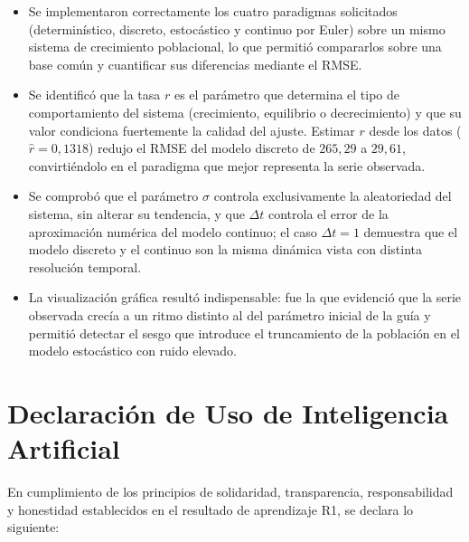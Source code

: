 \documentclass[11pt,a4paper]{article}
\begin{document}
\begin{itemize}[leftmargin=*]
  \item Se implementaron correctamente los cuatro paradigmas solicitados
        (determin\'istico, discreto, estoc\'astico y continuo por Euler) sobre un mismo
        sistema de crecimiento poblacional, lo que permiti\'o compararlos sobre una base
        com\'un y cuantificar sus diferencias mediante el RMSE.

  \item Se identific\'o que la tasa $r$ es el par\'ametro que determina el tipo de
        comportamiento del sistema (crecimiento, equilibrio o decrecimiento) y que su
        valor condiciona fuertemente la calidad del ajuste. Estimar $r$ desde los datos
        ($\hat{r} = 0{,}1318$) redujo el RMSE del modelo discreto de $265{,}29$ a
        $29{,}61$, convirti\'endolo en el paradigma que mejor representa la serie
        observada.

  \item Se comprob\'o que el par\'ametro $\sigma$ controla exclusivamente la
        aleatoriedad del sistema, sin alterar su tendencia, y que $\Delta t$ controla el
        error de la aproximaci\'on num\'erica del modelo continuo; el caso
        $\Delta t = 1$ demuestra que el modelo discreto y el continuo son la misma
        din\'amica vista con distinta resoluci\'on temporal.

  \item La visualizaci\'on gr\'afica result\'o indispensable: fue la que evidenci\'o que la
        serie observada crec\'ia a un ritmo distinto al del par\'ametro inicial de la
        gu\'ia y permiti\'o detectar el sesgo que introduce el truncamiento de la
        poblaci\'on en el modelo estoc\'astico con ruido elevado.
\end{itemize}

\newpage

\section{Declaraci\'on de Uso de Inteligencia Artificial}

En cumplimiento de los principios de solidaridad, transparencia, responsabilidad y
honestidad establecidos en el resultado de aprendizaje R1, se declara lo siguiente:
\end{document}
